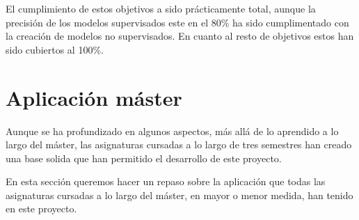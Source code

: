 El cumplimiento de estos objetivos a sido prácticamente total, aunque la precisión de los modelos supervisados este en el 80\% ha sido cumplimentado con la creación de modelos no supervisados. En cuanto al resto de objetivos estos han sido cubiertos al 100\%.





\section{Aplicación máster}

Aunque se ha profundizado en algunos aspectos, más allá de lo aprendido a lo largo del máster, las asignaturas cursadas a lo largo de tres semestres han creado una base solida que han permitido el desarrollo de este proyecto.

En esta sección queremos hacer un repaso sobre la aplicación que todas las asignaturas cursadas a lo largo del máster, en mayor o menor medida, han tenido en este proyecto. 

